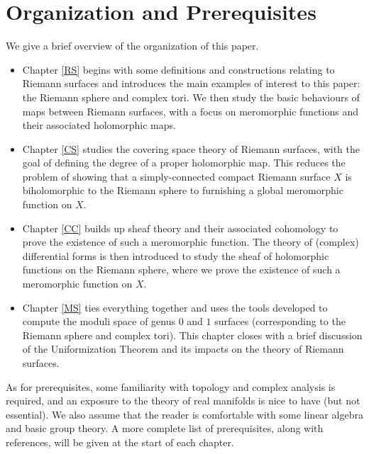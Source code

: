 \documentclass[../Moduli_Spaces_of_Riemann_Surfaces.tex]{subfiles}
\begin{document}
    \section{Organization and Prerequisites}
    We give a brief overview of the organization of this paper.
    \begin{itemize}
        \item Chapter \ref{RS} begins with some definitions and constructions relating to Riemann surfaces and introduces the main examples of interest to this paper: the Riemann sphere and complex tori. We then study the basic behaviours of maps between Riemann surfaces, with a focus on meromorphic functions and their associated holomorphic maps.
            \vspace{-0.05in}
        \item Chapter \ref{CS} studies the covering space theory of Riemann surfaces, with the goal of defining the degree of a proper holomorphic map. This reduces the problem of showing that a simply-connected compact Riemann surface $X$ is biholomorphic to the Riemann sphere to furnishing a global meromorphic function on $X$.
            \vspace{-0.05in}
        \item Chapter \ref{CC} builds up sheaf theory and their associated cohomology to prove the existence of such a meromorphic function. The theory of (complex) differential forms is then introduced to study the sheaf of holomorphic functions on the Riemann sphere, where we prove the existence of such a meromorphic function on $X$.
            \vspace{-0.05in}
        \item Chapter \ref{MS} ties everything together and uses the tools developed to compute the moduli space of genus $0$ and $1$ surfaces (corresponding to the Riemann sphere and complex tori). This chapter closes with a brief discussion of the Uniformization Theorem and its impacts on the theory of Riemann surfaces.
    \end{itemize}
    As for prerequisites, some familiarity with topology and complex analysis is required, and an exposure to the theory of real manifolds is nice to have (but not essential). We also assume that the reader is comfortable with some linear algebra and basic group theory. A more complete list of prerequisites, along with references, will be given at the start of each chapter.
\end{document}
